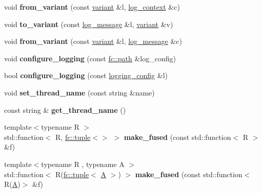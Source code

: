 \begin{DoxyCompactItemize}
void {\bfseries from\+\_\+variant} (const \mbox{\hyperlink{classfc_1_1variant}{variant}} \&l, \mbox{\hyperlink{classfc_1_1log__context}{log\+\_\+context}} \&c)
\item 
\mbox{\label{namespacefc_ab05ec647d778a15b40131c0aa3fb1d6a}} 
void {\bfseries to\+\_\+variant} (const \mbox{\hyperlink{classfc_1_1log__message}{log\+\_\+message}} \&l, \mbox{\hyperlink{classfc_1_1variant}{variant}} \&v)
\item 
\mbox{\label{namespacefc_a414797c3e1b2bde73ccae17379991abc}} 
void {\bfseries from\+\_\+variant} (const \mbox{\hyperlink{classfc_1_1variant}{variant}} \&l, \mbox{\hyperlink{classfc_1_1log__message}{log\+\_\+message}} \&c)
\item 
\mbox{\label{namespacefc_ad64fa786e47f4f646fb607f1a039c680}} 
void {\bfseries configure\+\_\+logging} (const \mbox{\hyperlink{classfc_1_1path}{fc\+::path}} \&log\+\_\+config)
\item 
\mbox{\label{namespacefc_ace3814ab7420ae02c6ed8876e7c5c570}} 
bool {\bfseries configure\+\_\+logging} (const \mbox{\hyperlink{structfc_1_1logging__config}{logging\+\_\+config}} \&l)
\item 
\mbox{\label{namespacefc_a655ac013a9263a91e57da251761e47c8}} 
void {\bfseries set\+\_\+thread\+\_\+name} (const string \&name)
\item 
\mbox{\label{namespacefc_a6b490790e2e4297225ecaee475b64ccb}} 
const string \& {\bfseries get\+\_\+thread\+\_\+name} ()
\item 
\mbox{\label{namespacefc_a10617bc0dbd370d8f38f49b5d79a56ed}} 
{\footnotesize template$<$typename R $>$ }\\std\+::function$<$ R, \mbox{\hyperlink{structfc_1_1tuple}{fc\+::tuple}}$<$$>$ $>$ {\bfseries make\+\_\+fused} (const std\+::function$<$ R $>$ \&f)
\item 
\mbox{\label{namespacefc_a799bf0ab81cb01fb35bc999f9422f305}} 
{\footnotesize template$<$typename R , typename A $>$ }\\std\+::function$<$ R(\mbox{\hyperlink{structfc_1_1tuple}{fc\+::tuple}}$<$ \mbox{\hyperlink{struct_a}{A}} $>$) $>$ {\bfseries make\+\_\+fused} (const std\+::function$<$ R(\mbox{\hyperlink{struct_a}{A}})$>$ \&f)
$$
\end{DoxyCompactItemize}
